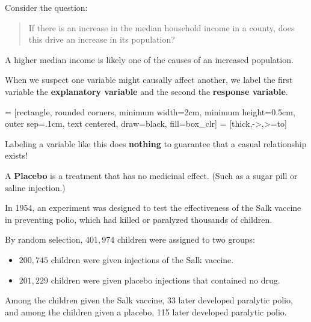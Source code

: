 \documentclass{beamer}
\begin{document}
\begin{frame}
\begin{example}
Consider the question:
\blockquote{If there is an increase in the median household income in a county, does this drive an increase in its population?}\pause

A higher median income is likely one of the causes of an increased population.
\end{example}\pause

\begin{definition}
When we suspect one variable might causally affect another, we label the first variable the \textbf{explanatory variable} and the second the \textbf{response variable}.
\vspace{-4mm}
\begin{center}
 = [rectangle, rounded corners, minimum width=2cm, minimum height=0.5cm, outer sep=.1cm, text centered, draw=black, fill=box_clr]
 = [thick,->,>=to]
\end{center}
\end{definition}\pause

\begin{note}
Labeling a variable like this does \textbf{nothing} to guarantee that a casual relationship exists!
\end{note}
\end{frame}

\begin{frame}
\begin{definition}
A \textbf{Placebo} is a treatment that has no medicinal effect. (Such as a sugar pill or saline injection.)
\end{definition}\pause

\begin{example}
In 1954, an experiment was designed to test the effectiveness of the Salk vaccine in preventing polio, which had killed or paralyzed thousands of children.\pause

By random selection, $401, 974$ children were assigned to two groups:
\begin{itemize}
\item $200,745$ children were given injections of the Salk vaccine.
\item $201,229$ children were given placebo injections that contained no drug.
\end{itemize}\pause

Among the children given the Salk vaccine, 33 later developed paralytic polio, and among the children given a placebo, 115 later developed paralytic polio.
\end{example}
\end{frame}
\end{document}
